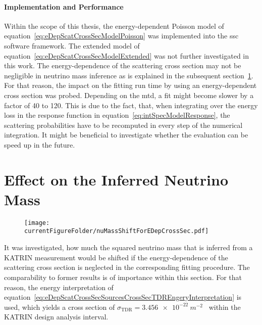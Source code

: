 \paragraph{Implementation and Performance}
Within the scope of this thesis, the energy-dependent Poisson model of equation~\eqref{eq:eDepScatCrossSecModelPoisson} was implemented into the \gls{ssc} software framework. The extended model of equation~\eqref{eq:eDepScatCrossSecModelExtended} was not further investigated in this work. The energy-dependence of the scattering cross section may not be negligible in neutrino mass inference as is explained in the subsequent section~\ref{sec:eDepScatCrossSecNuMassInf}. For that reason, the impact on the fitting run time by using an energy-dependent cross section was probed. Depending on the \gls{mtd}, a fit might become slower by a factor of 40 to 120. This is due to the fact, that, when integrating over the energy loss in the response function in equation~\eqref{eq:intSpecModelResponse}, the scattering probabilities have to be recomputed in every step of the numerical integration. It might be beneficial to investigate whether the evaluation can be speed up in the future.


\section{Effect on the Inferred Neutrino Mass}
\label{sec:eDepScatCrossSecNuMassInf}
\begin{figure}[t]
\texttt{[image: \\currentFigureFolder/nuMassShiftForEDepCrossSec.pdf]}
        \label{fig:eDepScatCrossSecNuMassInfShifts}
\end{figure}
It was investigated, how much the squared neutrino mass that is inferred from a KATRIN measurement would be shifted if the energy-dependence of the scattering cross section is neglected in the corresponding fitting procedure. The comparability to former results is of importance within this section. For that reason, the energy interpretation of equation~\eqref{eq:eDepScatCrossSecSourcesCrossSecTDREngeryInterpretation} is used, which yields a cross section of $\sigma_\mathrm{TDR}=\SI{3.456e-22}{m^{-2}}$~\cite{Angrik:2005ep} within the KATRIN design analysis interval.

